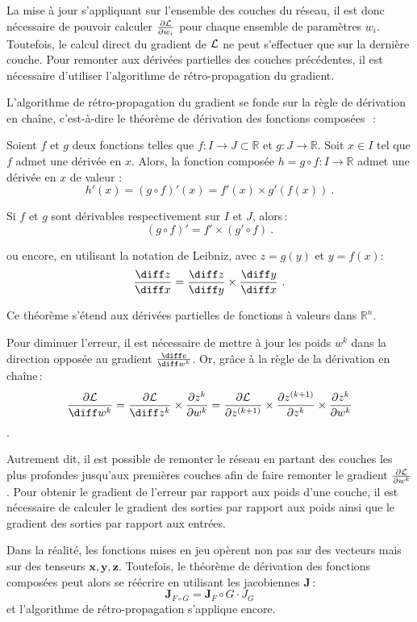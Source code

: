 La mise à jour s'appliquant sur l'ensemble des couches du réseau, il est donc nécessaire de pouvoir calculer $\frac{\partial \mathcal{L}}{\partial w_i}$ pour chaque ensemble de paramètres $w_i$. Toutefois, le calcul direct du gradient de $\mathcal{L}$ ne peut s'effectuer que sur la dernière couche. Pour remonter aux dérivées partielles des couches précédentes, il est nécessaire d'utiliser l'algorithme de rétro-propagation du gradient.

L'algorithme de rétro-propagation du gradient se fonde sur la règle de dérivation en chaîne, c'est-à-dire le théorème de dérivation des fonctions composées~\cite{lhospital_analyse_1716,lagrange_theorie_1797}\,:
\begin{theorem}
Soient $f$ et $g$ deux fonctions telles que $f : I \rightarrow J \subset \mathbb{R}$ et $g : J \rightarrow \mathbb{R}$. Soit $x \in I$ tel que $f$ admet une dérivée en $x$. Alors, la fonction composée $h = g \circ f : I \rightarrow \mathbb{R}$ admet une dérivée en $x$ de valeur :
$$h'(x) = (g \circ f)'(x) = f'(x) \times g'(f(x))~.$$

Si $f$ et $g$ sont dérivables respectivement sur $I$ et $J$, alors\,:
$$(g \circ f)' = f' \times (g' \circ f)~.$$

ou encore, en utilisant la notation de Leibniz, avec $z = g(y)$ et $y = f(x)$:
$$\frac{\diff z}{\diff x} = \frac{\diff z}{\diff y} \times \frac{\diff y}{\diff x}~.$$
\end{theorem}

Ce théorème s'étend aux dérivées partielles de fonctions à valeurs dans $\mathbb{R}^n$.

Pour diminuer l'erreur, il est nécessaire de mettre à jour les poids $w^k$ dans la direction opposée au gradient $\frac{\diff e}{\diff w^k}$. Or, grâce à la règle de la dérivation en chaîne\,:
$$\frac{\partial \L}{\diff w^k} = \frac{\partial \L}{\diff z^k} \times \frac{\partial z^k}{\partial w^k} = \frac{\partial \L}{\partial z^{(k+1)}} \times \frac{\partial z^{(k+1)}}{\partial z^k} \times \frac{\partial z^k}{\partial w^k}$$.

Autrement dit, il est possible de remonter le réseau en partant des couches les plus profondes jusqu'aux premières couches afin de faire remonter le gradient $\frac{\partial \mathcal{L}}{\partial w^k}$. Pour obtenir le gradient de l'erreur par rapport aux poids d'une couche, il est nécessaire de calculer le gradient des sorties par rapport aux poids ainsi que le gradient des sorties par rapport aux entrées.

Dans la réalité, les fonctions mises en jeu opèrent non pas sur des vecteurs mais sur des tenseurs $\mathbf{x}, \mathbf{y}, \mathbf{z}$. Toutefois, le théorème de dérivation des fonctions composées peut alors se réécrire en utilisant les jacobiennes $\mathbf{J}$\,:
$$\mathbf{J}_{F \circ G} = \mathbf{J}_F \circ G \cdot J_G$$
et l'algorithme de rétro-propagation s'applique encore.


